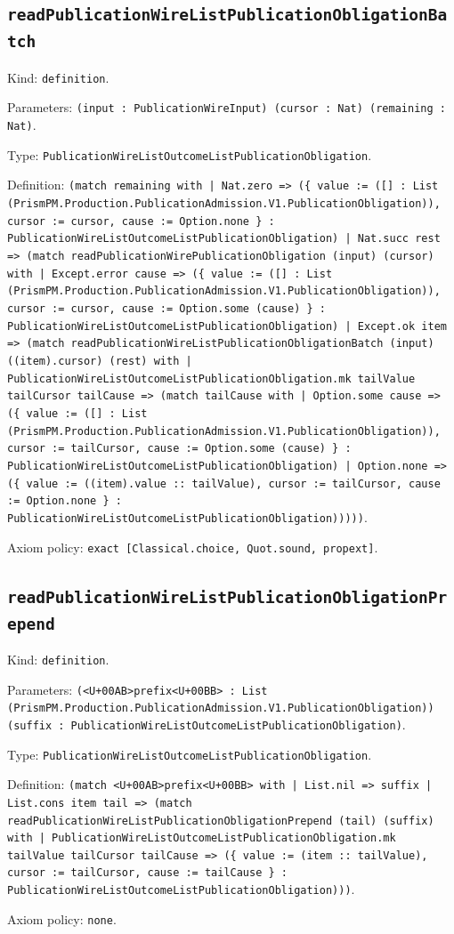 \documentclass[11pt]{article}
\begin{document}
\subsection*{\texttt{readPublicationWireListPublicationObligationBatch}}
\noindent Kind: \texttt{definition}.\par
\noindent Parameters: \texttt{(input : PublicationWireInput) (cursor : Nat) (remaining : Nat)}.\par
\noindent Type: \texttt{PublicationWireListOutcomeListPublicationObligation}.\par
\noindent Definition: \texttt{(match remaining with | Nat.zero => (\{ value := ([] : List (PrismPM.Production.PublicationAdmission.V1.PublicationObligation)), cursor := cursor, cause := Option.none \} : PublicationWireListOutcomeListPublicationObligation) | Nat.succ rest => (match readPublicationWirePublicationObligation (input) (cursor) with | Except.error cause => (\{ value := ([] : List (PrismPM.Production.PublicationAdmission.V1.PublicationObligation)), cursor := cursor, cause := Option.some (cause) \} : PublicationWireListOutcomeListPublicationObligation) | Except.ok item => (match readPublicationWireListPublicationObligationBatch (input) ((item).cursor) (rest) with | PublicationWireListOutcomeListPublicationObligation.mk tailValue tailCursor tailCause => (match tailCause with | Option.some cause => (\{ value := ([] : List (PrismPM.Production.PublicationAdmission.V1.PublicationObligation)), cursor := tailCursor, cause := Option.some (cause) \} : PublicationWireListOutcomeListPublicationObligation) | Option.none => (\{ value := ((item).value :: tailValue), cursor := tailCursor, cause := Option.none \} : PublicationWireListOutcomeListPublicationObligation)))))}.\par
\noindent Axiom policy: \texttt{exact [Classical.choice, Quot.sound, propext]}.\par
\subsection*{\texttt{readPublicationWireListPublicationObligationPrepend}}
\noindent Kind: \texttt{definition}.\par
\noindent Parameters: \texttt{(<U+00AB>prefix<U+00BB> : List (PrismPM.Production.PublicationAdmission.V1.PublicationObligation)) (suffix : PublicationWireListOutcomeListPublicationObligation)}.\par
\noindent Type: \texttt{PublicationWireListOutcomeListPublicationObligation}.\par
\noindent Definition: \texttt{(match <U+00AB>prefix<U+00BB> with | List.nil => suffix | List.cons item tail => (match readPublicationWireListPublicationObligationPrepend (tail) (suffix) with | PublicationWireListOutcomeListPublicationObligation.mk tailValue tailCursor tailCause => (\{ value := (item :: tailValue), cursor := tailCursor, cause := tailCause \} : PublicationWireListOutcomeListPublicationObligation)))}.\par
\noindent Axiom policy: \texttt{none}.\par
\end{document}
